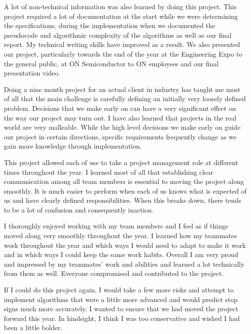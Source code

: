 \documentclass[letterpaper,10pt,titlepage]{article}
\begin{document}
A lot of non-technical information was also learned by doing this project. This
project required a lot of documentation at the start while we were 
determining the specifications, during the implementation when we documented 
the pseudocode and algorithmic complexity of the algorithms as well as our 
final report. My technical writing skills have improved as a result. We also 
presented our project, particularly towards the end of the year at the 
Engineering Expo to the general public, at ON Semiconductor to ON employees and
our final presentation video. 

Doing a nine month project for an actual client in industry has taught me most
of all that the main challenge is carefully defining an initially very 
loosely defined problem. Decisions that we make early on can have a very 
significant effect on the way our project may turn out. I have also learned 
that projects in the real world are very malleable. While the high level 
decisions we make early on guide our project in certain directions, specific 
requirements frequently change as we gain more knowledge through 
implementation. 

This project allowed each of use to take a project management role at different
times throughout the year. I learned most of all that establishing clear 
communication among all team members is essential to moving the project along 
smoothly. It is much easier to perform when each of us knows what is expected
of us and have clearly defined responsibilities. When this breaks down, there 
tends to be a lot of confusion and consequently inaction. 

I thoroughly enjoyed working with my team members and I feel as if things 
moved along very smoothly throughout the year. I learned how my teammates work
throughout the year and which ways I would need to adapt to make it work and
in which ways I could keep the same work habits. Overall I am very proud and 
impressed by my teammates' work and abilities and learned a lot technically
from them as well. Everyone compromised and contributed to the project. 

If I could do this project again, I would take a few more risks and attempt to
implement algorithms that were a little more advanced and would predict stop 
signs much more accurately. I wanted to ensure that we had moved the project 
forward this year. In hindsight, I think I was too conservative and wished I 
had been a little bolder.

\end{document}
